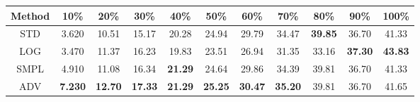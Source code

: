 \documentclass{standalone}
\begin{document}
\begin{tabular}{c|cccccccccc}
      \toprule
      Method & 10\% & 20\% & 30\% & 40\% & 50\% & 60\% & 70\% & 80\% & 90\% & 100\% \\
      \midrule
STD & 3.620 & 10.51 & 15.17 & 20.28 & 24.94 & 29.79 & 34.47 & \textbf{39.85} & 36.70 & 41.33\\
LOG & 3.470 & 11.37 & 16.23 & 19.83 & 23.51 & 26.94 & 31.35 & 33.16 & \textbf{37.30} & \textbf{43.83}\\
SMPL & 4.910 & 11.08 & 16.34 & \textbf{21.29} & 24.64 & 29.86 & 34.39 & 39.81 & 36.70 & 41.33\\
ADV & \textbf{7.230} & \textbf{12.70} & \textbf{17.33} & \textbf{21.29} & \textbf{25.25} & \textbf{30.47} & \textbf{35.20} & 39.81 & 36.70 & 41.65\\
  \bottomrule
\end{tabular}
\end{document}
